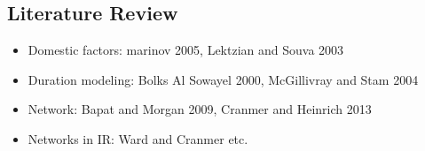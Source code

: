 \subsection{Literature Review}
\label{lit}

\begin{itemize}
	\item Domestic factors: marinov 2005, Lektzian and Souva 2003
	\item Duration modeling: Bolks Al Sowayel 2000, McGillivray and Stam 2004
	\item Network: Bapat and Morgan 2009, Cranmer and Heinrich 2013
	\item Networks in IR: Ward and Cranmer etc. 
\end{itemize}